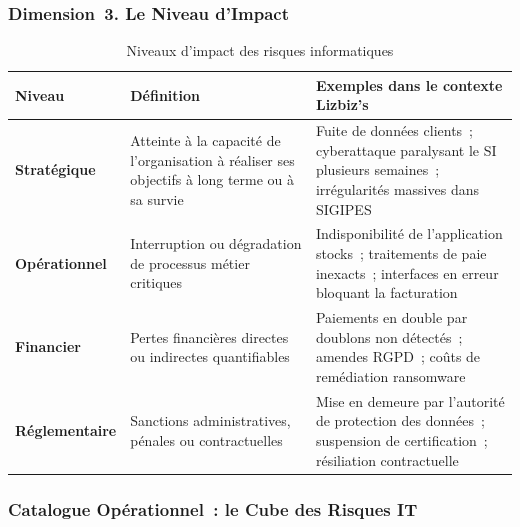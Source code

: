 \subsubsection{Dimension~3. Le Niveau d'Impact}

\begin{table}[H]
\centering
\small
\renewcommand{\arraystretch}{1.5}
\caption{Niveaux d'impact des risques informatiques}
\label{tab:niveaux-impact}
\begin{tabular}{|p{2.5cm}|p{4cm}|p{6cm}|}
    \hline
    \rowcolor{gray!20}
    \textbf{Niveau} & \textbf{Définition} &
    \textbf{Exemples dans le contexte Lizbiz's} \\ \hline
    \textbf{Stratégique} &
    Atteinte à la capacité de l'organisation à réaliser ses objectifs
    à long terme ou à sa survie &
    Fuite de données clients~; cyberattaque paralysant le SI
    plusieurs semaines~; irrégularités massives dans SIGIPES \\ \hline
    \textbf{Opérationnel} &
    Interruption ou dégradation de processus métier critiques &
    Indisponibilité de l'application stocks~;
    traitements de paie inexacts~;
    interfaces en erreur bloquant la facturation \\ \hline
    \textbf{Financier} &
    Pertes financières directes ou indirectes quantifiables &
    Paiements en double par doublons non détectés~;
    amendes RGPD~; coûts de remédiation ransomware \\ \hline
    \textbf{Réglementaire} &
    Sanctions administratives, pénales ou contractuelles &
    Mise en demeure par l'autorité de protection des données~;
    suspension de certification~; résiliation contractuelle \\ \hline
\end{tabular}
\end{table}

\subsubsection{Catalogue Opérationnel~: le Cube des Risques IT}

